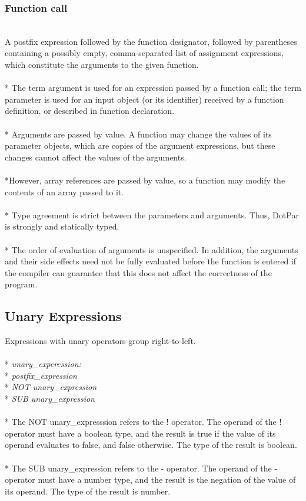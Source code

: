 \documentclass[11pt]{article}
\newcommand{\tab}{\hspace*{2em}}
\begin{document}
\subsubsection{Function call}
\\ A postfix expression followed by the function designator, followed by parentheses containing a possibly empty, comma-separated list of assignment expressions, which constitute the arguments to the given function.   
\\ \\* The term argument is used for an expression passed by a function call; the term parameter is used for an input object (or its identifier) received by a function definition, or described in function declaration.
\\ \\* Arguments are passed by value. A function may change the values of its parameter objects, which are copies of the argument expressions, but these changes cannot affect the values of the arguments. 
\\ \\*However, array references are passed by value, so a function may modify the contents of an array passed to it. 
\\ \\* Type agreement is strict between the parameters and arguments. Thus, DotPar is strongly and statically typed.          
\\ \\* The order of evaluation of arguments is unspecified. In addition, the arguments and their side effects need not be fully evaluated before the function is entered if the compiler can guarantee that this does not affect the correctness of the program. 

\subsection{Unary Expressions}
Expressions with unary operators group right-to-left.
\\ \\* \tab \emph{unary\_experession:}
\\* \tab \tab \emph{postfix\_expression}
\\* \tab \tab \emph{NOT unary\_expression}
\\* \tab \tab \emph{SUB unary\_expression}
\\ \\* The NOT unary\_expresssion refers to the ! operator. The operand of the ! operator must have a boolean type, and the result is true if the value of its operand evaluates to false, and false otherwise. The type of the result is boolean.
\\ \\* The SUB unary\_expression refers to the - operator. The operand of the - operator must have a number type, and the result is the negation of the value of its operand. The type of the result is number.
\end{document}
